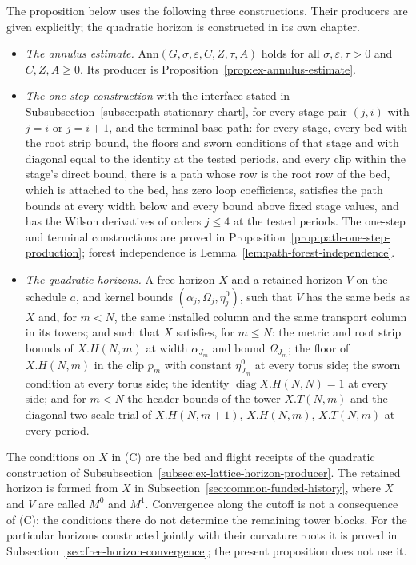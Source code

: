 The proposition below uses the following three constructions. Their
producers are given explicitly; the quadratic horizon is constructed in
its own chapter.
\begin{itemize}
\item[(A)] \emph{The annulus estimate.} $\mathrm{Ann}(G,\sigma,
 \varepsilon,C,Z,\tau,A)$ holds for all $\sigma,\varepsilon,\tau>0$
 and $C,Z,A\ge0$. Its producer is Proposition~\ref{prop:ex-annulus-estimate}.
\item[(B)] \emph{The one-step construction} with the interface stated
 in Subsubsection~\ref{subsec:path-stationary-chart}, for every stage pair
 $(j,i)$ with $j=i$ or $j=i+1$, and the terminal base path: for every
 stage, every bed with the root strip bound, the floors and sworn
 conditions of that stage and with diagonal equal to the identity at
 the tested periods, and every clip within the stage's direct bound,
 there is a path whose row is the root row of the bed, which is
 attached to the bed, has zero loop coefficients, satisfies the path
 bounds at every width below and every bound above fixed stage
 values, and has the Wilson derivatives of orders $j\le4$ at the
 tested periods. The one-step and terminal constructions are proved in
 Proposition~\ref{prop:path-one-step-production}; forest independence is
 Lemma~\ref{lem:path-forest-independence}.
\item[(C)] \emph{The quadratic horizons.} A free horizon $X$ and a
 retained horizon $V$ on the schedule $a$, and kernel bounds
 $(\alpha_j,\Omega_j,\eta^0_j)$, such that $V$ has the same beds as
 $X$ and, for $m<N$, the same installed column and the same transport
 column in its towers; and such that $X$ satisfies, for $m\le N$: the
 metric and root strip bounds of $X.H(N,m)$ at width $\alpha_{J_m}$
 and bound $\Omega_{J_m}$; the floor of $X.H(N,m)$ in the clip $p_m$
 with constant $\eta^0_{J_m}$ at every torus side; the sworn condition
 at every torus side; the identity $\operatorname{diag}X.H(N,N)=1$ at
 every side; and for $m<N$ the header bounds of the tower $X.T(N,m)$
 and the diagonal two-scale trial of $X.H(N,m+1)$, $X.H(N,m)$,
 $X.T(N,m)$ at every period.
\end{itemize}
The conditions on $X$ in (C) are the bed and flight receipts of the
quadratic construction of
Subsubsection~\ref{subsec:ex-lattice-horizon-producer}. The retained horizon
is formed from $X$ in Subsection~\ref{sec:common-funded-history}, where
$X$ and $V$ are called $M^0$ and $M^1$. Convergence along the cutoff
is not a consequence of (C): the conditions there do not determine
the remaining tower blocks. For the particular horizons constructed
jointly with their curvature roots it is proved in
Subsection~\ref{sec:free-horizon-convergence}; the present proposition
does not use it.

